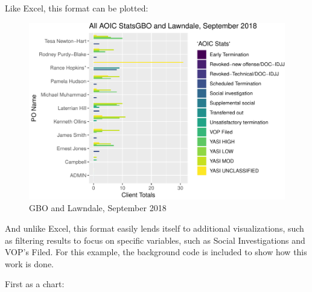 \documentclass[12pt,]{article}
\newenvironment{Shaded}{\begin{snugshade}}{\end{snugshade}}
\newcommand{\DataTypeTok}[1]{\textcolor[rgb]{0.13,0.29,0.53}{#1}}
\newcommand{\DecValTok}[1]{\textcolor[rgb]{0.00,0.00,0.81}{#1}}
\newcommand{\KeywordTok}[1]{\textcolor[rgb]{0.13,0.29,0.53}{\textbf{#1}}}
\newcommand{\NormalTok}[1]{#1}
\newcommand{\OperatorTok}[1]{\textcolor[rgb]{0.81,0.36,0.00}{\textbf{#1}}}
\newcommand{\OtherTok}[1]{\textcolor[rgb]{0.56,0.35,0.01}{#1}}
\newcommand{\StringTok}[1]{\textcolor[rgb]{0.31,0.60,0.02}{#1}}
\begin{document}
Like Excel, this format can be plotted:

\begin{figure}[h]
\includegraphics[width=0.9\linewidth,height=0.9\textheight,]{reporting_updates_files/figure-latex/initial_graphs-1} \caption{GBO and Lawndale, September 2018}\label{fig:initial_graphs}
\end{figure}

\newpage

And unlike Excel, this format easily lends itself to additional
visualizations, such as filtering results to focus on specific
variables, such as Social Investigations and VOP's Filed. For this
example, the background code is included to show how this work is done.

First as a chart:

\begin{Shaded}
\end{Shaded}
\end{document}
